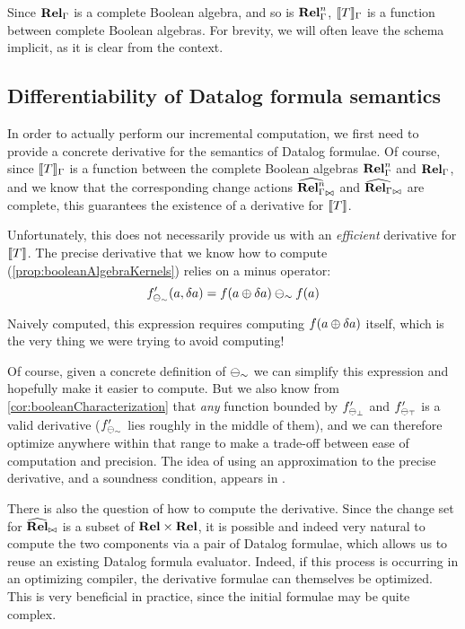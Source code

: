 Since $\mathbf{Rel}_\Gamma$ is a complete Boolean algebra, and so is $\mathbf{Rel}_\Gamma^n$, $\llbracket T \rrbracket_\Gamma$ is
a function between complete Boolean algebras. For brevity, we will often leave the schema implicit,
as it is clear from the context.

\subsection{Differentiability of Datalog formula semantics}
\label{sec:datalogDifferentiability}

In order to actually perform our incremental computation, we first need to provide a concrete derivative for the semantics
of Datalog formulae. Of course, since $\llbracket T \rrbracket_\Gamma$ is a function between the complete Boolean algebras 
$\mathbf{Rel}_\Gamma^n$ and
$\mathbf{Rel}_\Gamma$, and we know that the corresponding change actions 
$\widehat{\mathbf{Rel}_\Gamma^n}_{\bowtie}$ and $\widehat{\mathbf{Rel}_\Gamma}_{\bowtie}$
are complete, this guarantees the existence of a derivative for $\llbracket T \rrbracket$.

Unfortunately, this does not necessarily provide us with an \emph{efficient} 
derivative for $\llbracket T \rrbracket$. The precise derivative that we know how to compute
(\cref{prop:booleanAlgebraKernels}) relies on
a minus operator:
\begin{displaymath}
  f'_{\ominus_\sim}(a, \delta a) = f(a \oplus \delta a) \ominus_\sim f(a)
\end{displaymath}

Naively computed, this expression requires computing $f(a \oplus \delta a)$
itself, which is the very thing we were trying to avoid computing!

Of course, given a concrete definition of $\ominus_\sim$ we can simplify this
expression and hopefully make it easier to compute. But we also know from
\cref{cor:booleanCharacterization} that \emph{any} function bounded by
$f'_{\ominus_\bot}$ and $f'_{\ominus_\top}$ is a valid
derivative ($f'_{\ominus_\sim}$ lies roughly in the middle of them),
and we can therefore optimize anywhere within that range to make a 
trade-off between ease of computation and precision.
The idea of using an approximation
to the precise derivative, and a soundness condition, appears in \textcite{bancilhon1986amateur}.

There is also the question of how to compute the derivative. Since the change
set for $\widehat{\mathbf{Rel}}_{\bowtie}$ is a subset of $\mathbf{Rel} \times \mathbf{Rel}$, it
is possible and indeed very natural to compute the two components via a pair of
Datalog formulae, which allows us to reuse an existing Datalog formula
evaluator. Indeed, if this process is occurring in an optimizing compiler,
the derivative formulae can themselves be optimized. This is very 
beneficial in practice, since the initial formulae may be quite complex.

